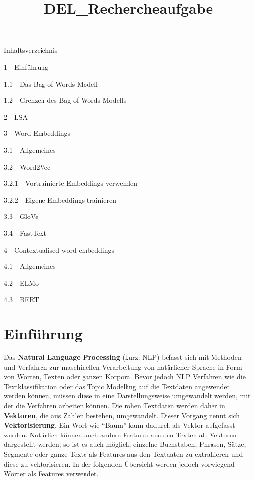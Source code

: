 \documentclass[11pt]{article}
\title{DEL\_Rechercheaufgabe}
\begin{document}
    
    \maketitle
    
    

    
    Inhaltsverzeichnis{}

{{1~~}Einführung}

{{1.1~~}Das Bag-of-Words Modell}

{{1.2~~}Grenzen des Bag-of-Words Modells}

{{2~~}LSA}

{{3~~}Word Embeddings}

{{3.1~~}Allgemeines}

{{3.2~~}Word2Vec}

{{3.2.1~~}Vortrainierte Embeddings verwenden}

{{3.2.2~~}Eigene Embeddings trainieren}

{{3.3~~}GloVe}

{{3.4~~}FastText}

{{4~~}Contextualised word embeddings}

{{4.1~~}Allgemeines}

{{4.2~~}ELMo}

{{4.3~~}BERT}

    \hypertarget{einfuxfchrung}{%
\section{Einführung}\label{einfuxfchrung}}

    Das \textbf{Natural Language Processing} (kurz: NLP) befasst sich mit
Methoden und Verfahren zur maschinellen Verarbeitung von natürlicher
Sprache in Form von Worten, Texten oder ganzen Korpora. Bevor jedoch NLP
Verfahren wie die Textklassifikation oder das Topic Modelling auf die
Textdaten angewendet werden können, müssen diese in eine
Darstellungsweise umgewandelt werden, mit der die Verfahren arbeiten
können. Die rohen Textdaten werden daher in \textbf{Vektoren}, die aus
Zahlen bestehen, umgewandelt. Dieser Vorgang nennt sich
\textbf{Vektorisierung}. Ein Wort wie ``Baum'' kann dadurch als Vektor
aufgefasst werden. Natürlich können auch andere Features aus den Texten
als Vektoren dargestellt werden; so ist es auch möglich, einzelne
Buchstaben, Phrasen, Sätze, Segmente oder ganze Texte als Features aus
den Textdaten zu extrahieren und diese zu vektorisieren. In der
folgenden Übersicht werden jedoch vorwiegend Wörter als Features
verwendet.
\end{document}
